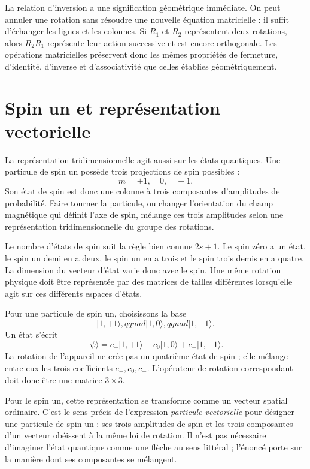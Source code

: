 La relation d’inversion a une signification géométrique immédiate. On peut annuler une rotation sans résoudre une nouvelle équation matricielle : il suffit d’échanger les lignes et les colonnes. Si \(R_1\) et \(R_2\) représentent deux rotations, alors \(R_2R_1\) représente leur action successive et est encore orthogonale. Les opérations matricielles préservent donc les mêmes propriétés de fermeture, d’identité, d’inverse et d’associativité que celles établies géométriquement.

\section{Spin un et représentation vectorielle}

La représentation tridimensionnelle agit aussi sur les états quantiques. Une particule de spin un possède trois projections de spin possibles :
\begin{equation}
m=+1,\quad 0,\quad -1.
\end{equation}
Son état de spin est donc une colonne à trois composantes d’amplitudes de probabilité. Faire tourner la particule, ou changer l’orientation du champ magnétique qui définit l’axe de spin, mélange ces trois amplitudes selon une représentation tridimensionnelle du groupe des rotations.

Le nombre d’états de spin suit la règle bien connue \(2s+1\). Le spin zéro a un état, le spin un demi en a deux, le spin un en a trois et le spin trois demis en a quatre. La dimension du vecteur d’état varie donc avec le spin. Une même rotation physique doit être représentée par des matrices de tailles différentes lorsqu’elle agit sur ces différents espaces d’états.

Pour une particule de spin un, choisissons la base
\begin{equation}
\lvert 1,+1\rangle,qquad
\lvert 1,0\rangle,qquad
\lvert 1,-1\rangle.
\end{equation}
Un état s’écrit
\begin{equation}
\lvert\psi\rangle
=c_{+}\lvert1,+1\rangle+c_0\lvert1,0\rangle+c_{-}\lvert1,-1\rangle.
\end{equation}
La rotation de l’appareil ne crée pas un quatrième état de spin ; elle mélange entre eux les trois coefficients \(c_+,c_0,c_-\). L’opérateur de rotation correspondant doit donc être une matrice \(3\times3\).

Pour le spin un, cette représentation se transforme comme un vecteur spatial ordinaire. C’est le sens précis de l’expression \emph{particule vectorielle} pour désigner une particule de spin un : ses trois amplitudes de spin et les trois composantes d’un vecteur obéissent à la même loi de rotation. Il n’est pas nécessaire d’imaginer l’état quantique comme une flèche au sens littéral ; l’énoncé porte sur la manière dont ses composantes se mélangent.

